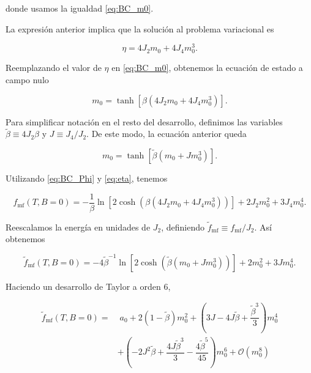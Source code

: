 \documentclass[10pt]{article}
\begin{document}
donde usamos la igualdad \ref{eq:BC_m0}.

La expresi\'on anterior implica que la soluci\'on al problema variacional es 

\begin{equation}\label{eq:eta}
\eta = 4 J_2 m_0 + 4 J_4 m_0^3.
\end{equation}

Reemplazando el valor de $\eta$ en \ref{eq:BC_m0}, obtenemos la ecuaci\'on de estado a campo nulo

\begin{equation}
m_0 = \tanh\left[\beta (4 J_2 m_0 + 4 J_4 m_0^3)\right].
\end{equation}

Para simplificar notaci\'on en el resto del desarrollo, definimos las variables $\tilde{\beta} \equiv 4 J_2 \beta$ y $J \equiv J_4/J_2$. De este modo, la ecuaci\'on anterior queda

\begin{equation}
m_0 = \tanh\left[\tilde{\beta} (m_0 + J m_0^3)\right].
\end{equation}



Utilizando  \ref{eq:BC_Phi} y \ref{eq:eta}, tenemos

\begin{equation}
f_{\mathrm{mf}}(T,B=0) = -\dfrac{1}{\beta} \ln \left[2 \cosh\left(\beta ( 4 J_2 m_0 + 4 J_4 m_0^3)\right) \right] +2 J_2 m_0^2 + 3 J_4 m_0^4.
\end{equation}

Reescalamos la energ\'ia en unidades de $J_2$, definiendo $\tilde{f}_{\mathrm{mf}} \equiv f_{\mathrm{mf}}/J_2$. As\'i obtenemos

\begin{equation}
\tilde{f}_{\mathrm{mf}}(T,B=0) = -4\tilde{\beta}^{-1} \ln \left[2 \cosh\left(\tilde{\beta} ( m_0 + J m_0^3)\right) \right] +2 m_0^2 + 3 J m_0^4.
\end{equation}

Haciendo un desarrollo de Taylor a orden 6,

\begin{align}
\tilde{f}_{\mathrm{mf}}(T,B=0) =& \;a_0 + 2(1-\tilde{\beta}) m_0^2 + 
\left(3J - 4J\tilde{\beta} + \dfrac{\tilde{\beta}^3}{3} \right) m_0^4 \nonumber \\
&+ \left(-2 J^2\tilde{\beta} + \dfrac{4J\tilde{\beta}^3}{3} - \dfrac{4\tilde{\beta}^5}{45}\right) m_0^6 + \mathcal{O}(m_0^8)
\end{align}
\end{document}
